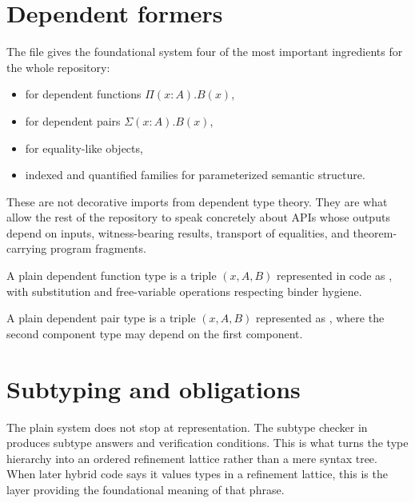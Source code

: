 \section*{Dependent formers}
The file  gives the foundational system four of the
most important ingredients for the whole repository:
\begin{itemize}[leftmargin=2em]
  \item {} for dependent functions $\Pi(x : A).B(x)$,
  \item {} for dependent pairs $\Sigma(x : A).B(x)$,
  \item {} for equality-like objects,
  \item indexed and quantified families for parameterized semantic structure.
\end{itemize}
These are not decorative imports from dependent type theory. They are what allow the rest
of the repository to speak concretely about APIs whose outputs depend on inputs,
witness-bearing results, transport of equalities, and theorem-carrying program fragments.

\begin{definition}
A plain dependent function type is a triple $(x, A, B)$ represented in code as
, with substitution and free-variable
operations respecting binder hygiene.
\end{definition}

\begin{definition}
A plain dependent pair type is a triple $(x, A, B)$ represented as
, where the second component type may depend on
the first component.
\end{definition}

\section*{Subtyping and obligations}
The plain system does not stop at representation. The subtype checker in
 produces subtype answers and verification conditions.
This is what turns the type hierarchy into an ordered refinement lattice rather than a mere
syntax tree. When later hybrid code says it values types in a refinement lattice, this is
the layer providing the foundational meaning of that phrase.

